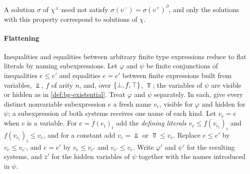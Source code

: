 A solution $\sigma$ of $\chi^\pm$ need not satisfy
$\sigma(v^-)=\sigma(v^+)^{\partial}$, and only the solutions with this property
correspond to solutions of $\chi$.

\paragraph{Flattening}
Inequalities and equalities between arbitrary finite type expressions reduce to
flat literals by naming subexpressions. Let $\varphi$ and $\psi$ be finite
conjunctions of inequalities $e\le e'$ and equalities $e=e'$ between finite
expressions built from variables, $\Bot$, $f$ of arity $n$, and, over $\{\bot,f,\top\}$,
$\Top$; the variables of $\psi$ are visible or hidden as in
\cref{def:bg-existential}. Treat $\varphi$ and $\psi$ separately. In each, give
every distinct nonvariable subexpression $e$ a fresh name $v_e$, visible for
$\varphi$ and hidden for $\psi$; a subexpression of both systems receives one
name of each kind. Let $v_e=e$ when $e$ is a variable. For $e=f(e_i)_i$ add the
\emph{defining literals}
$v_e\le f(v_{e_i})_i$ and $f(v_{e_i})_i\le v_e$, and for a constant add
$v_e=\Bot$ or $\Top\le v_e$. Replace $e\le e'$ by $v_e\le v_{e'}$, and $e=e'$
by $v_e\le v_{e'}$ and $v_{e'}\le v_e$. Write $\varphi'$ and $\psi'$ for the
resulting systems, and $\bar z'$ for the hidden variables of $\psi$ together
with the names introduced in $\psi$.

